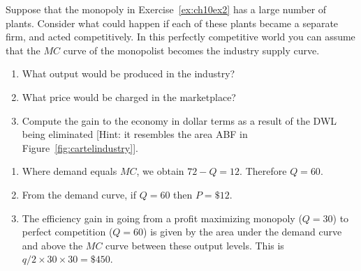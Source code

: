 \begin{enumialphparenastyle}
\begin{ex}\label{ex:ch10ex4}
Suppose that the monopoly in Exercise~\ref{ex:ch10ex2} has a large number of plants. Consider what could happen if each of these plants became a separate firm, and acted competitively. In this perfectly competitive world you can assume that the $MC$ curve of the monopolist becomes the industry supply curve.
\begin{enumerate}
	\item	What output would be produced in the industry? 
	\item	What price would be charged in the marketplace?
	\item	Compute the gain to the economy in dollar terms as a result of the DWL being eliminated [Hint: it resembles the area ABF in Figure~\ref{fig:cartelindustry}].
\end{enumerate}
\begin{sol}
\begin{enumerate}
	\item	Where demand equals $MC$, we obtain $72-Q=12$. Therefore $Q=60$.
	\item	From the demand curve, if $Q=60$ then $P=\$12$.
	\item	The efficiency gain in going from a profit maximizing monopoly ($Q=30$) to perfect competition ($Q=60$) is given by the area under the demand curve and above the $MC$ curve between these output levels. This is $q/2\times 30\times 30=\$450$.
\end{enumerate}
\end{sol}
\end{ex}


\end{enumialphparenastyle}
